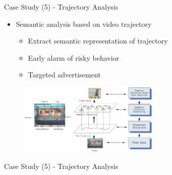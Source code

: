 \documentclass[
 size=14pt,
 paper=smartboard,  %
 mode=present, 		%
 display=slides, 	%
 style=tuliplab,  	%
 pauseslide,
 fleqn,leqno]{powerdot}{}
\begin{document}
\begin{slide}[toc=,bm=]{Case Study (5) - Trajectory Analysis}
\begin{itemize}
  \item Semantic analysis based on video trajectory
  \begin{itemize}
    \item Extract semantic representation of trajectory
    \item Early alarm of risky behavior
    \item Targeted advertisement
  \end{itemize}
\end{itemize}
\begin{figure}[htbp]
  \includegraphics[width=0.6\textwidth]{figures//theme1//dsa_3.eps}
\end{figure}

%
\footnotesize{}

\end{slide}



\begin{slide}[toc=,bm=]{Case Study (5) - Trajectory Analysis}
\begin{figure}[ht]
\end{figure}
\end{slide}
\end{document}
